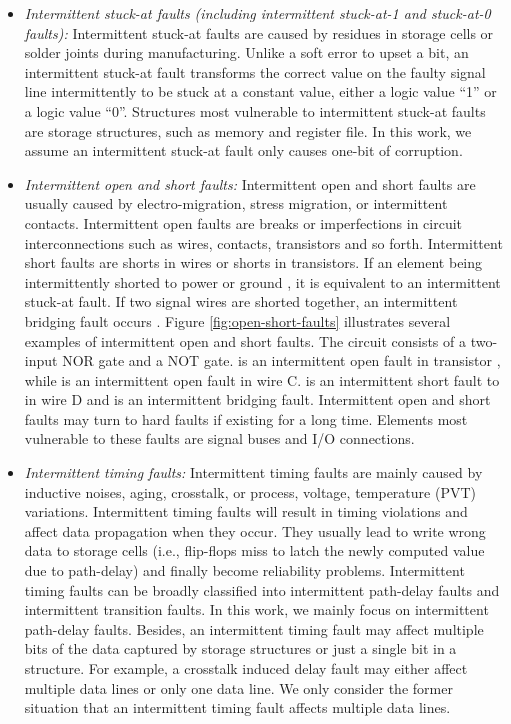 \begin{itemize}
    \item \textit{Intermittent stuck-at faults (including intermittent stuck-at-1 and stuck-at-0 faults):} Intermittent stuck-at faults are caused by residues in storage cells or solder joints during manufacturing. Unlike a soft error to upset a bit, an intermittent stuck-at fault transforms the correct value on the faulty signal line intermittently to be stuck at a constant value, either a logic value “1” or a logic value “0”. Structures most vulnerable to intermittent stuck-at faults are storage structures, such as memory and register file. In this work, we assume an intermittent stuck-at fault only causes one-bit of corruption.

    \item \textit{Intermittent open and short faults:} Intermittent open and short faults are usually caused by electro-migration, stress migration, or intermittent contacts. Intermittent open faults are breaks or imperfections in circuit interconnections such as wires, contacts, transistors and so forth. Intermittent short faults are shorts in wires or shorts in transistors. If an element being intermittently shorted to power or ground , it is equivalent to an intermittent stuck-at fault. If two signal wires are shorted together, an intermittent bridging fault occurs \cite{wang2006vlsi}. Figure \ref{fig:open-short-faults} illustrates several examples of intermittent open and short faults. The circuit consists of a two-input NOR gate and a NOT gate. is an intermittent open fault in transistor , while is an intermittent open fault in wire C. is an intermittent short fault to in wire D and is an intermittent bridging fault. Intermittent open and short faults may turn to hard faults if existing for a long time. Elements most vulnerable to these faults are signal buses and I/O connections.

    \item \textit{Intermittent timing faults:} Intermittent timing faults are mainly caused by inductive noises, aging, crosstalk, or process, voltage, temperature (PVT) variations. Intermittent timing faults will result in timing violations and affect data propagation when they occur. They usually lead to write wrong data to storage cells (i.e., flip-flops miss to latch the newly computed value due to path-delay) and finally become reliability problems. Intermittent timing faults can be broadly classified into intermittent path-delay faults and intermittent transition faults. In this work, we  mainly focus on intermittent path-delay faults. Besides, an intermittent timing fault may affect multiple bits of the data captured by storage structures or just a single bit in a structure. For example, a crosstalk induced delay fault may either affect multiple data lines or only one data line. We only consider the former situation that an intermittent timing fault affects multiple data lines.
\end{itemize}

